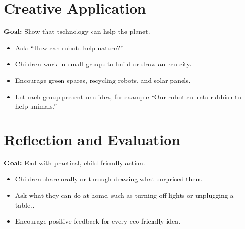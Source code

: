 \documentclass[11pt, a4paper]{article}
\begin{document}
\section{Creative Application}
\textbf{Goal:} Show that technology can help the planet.
\begin{itemize}
    \item Ask: ``How can robots help nature?''
    \item Children work in small groups to build or draw an eco-city.
    \item Encourage green spaces, recycling robots, and solar panels.
    \item Let each group present one idea, for example ``Our robot collects rubbish to help animals.'' 
\end{itemize}

\section{Reflection and Evaluation}
\textbf{Goal:} End with practical, child-friendly action.
\begin{itemize}
    \item Children share orally or through drawing what surprised them.
    \item Ask what they can do at home, such as turning off lights or unplugging a tablet.
    \item Encourage positive feedback for every eco-friendly idea.
\end{itemize}
\end{document}
